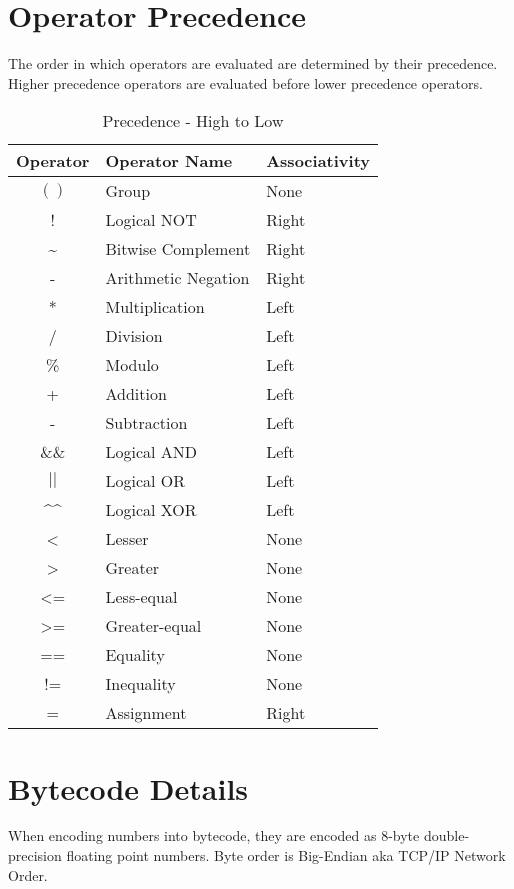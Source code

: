\documentclass{article}
\begin{document}
\section{Operator Precedence}
The order in which operators are evaluated are determined by their precedence.
Higher precedence operators are evaluated before lower precedence operators.

\begin{table}[h!]
\begin{center}
	\caption{Precedence - High to Low}
\begin{tabular}{|c|l|l|}
	\hline
	Operator & Operator Name & Associativity \\
	\hline
	$( )$              & Group               & None  \\
	!                  & Logical NOT         & Right \\
	\~{}               & Bitwise Complement  & Right \\
	-                  & Arithmetic Negation & Right \\

	*                  & Multiplication      & Left \\
	/                  & Division            & Left \\
	\%                 & Modulo              & Left \\

	+                  & Addition            & Left \\
	-                  & Subtraction         & Left \\

	\&\&               & Logical AND         & Left \\
	$||$               & Logical OR          & Left \\
	\^{}\^{}           & Logical XOR         & Left \\

	\textless          & Lesser              & None \\
	\textgreater       & Greater             & None \\
	\textless=         & Less-equal          & None \\
	\textgreater=      & Greater-equal       & None \\

	==                 & Equality            & None \\
	!=                 & Inequality          & None \\

	=                  & Assignment          & Right \\
	\hline
\end{tabular}
\end{center}
\end{table}

\section{Bytecode Details}
When encoding numbers into bytecode, they are encoded as 8-byte double-precision floating point numbers. Byte order is Big-Endian aka TCP/IP Network Order.
\end{document}

